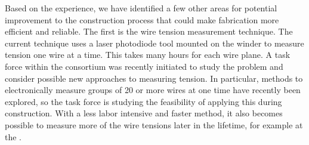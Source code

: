 Based on the  experience, we have identified a few other areas for potential improvement to the construction process that could make  fabrication more efficient and reliable.   The first is the wire tension measurement technique. The current technique uses a laser photodiode tool mounted on the winder to measure tension one wire at a time. This takes many hours for each wire plane. A task force within the consortium was recently initiated to study the problem and consider possible new approaches to measuring tension.  In particular, methods to electronically measure groups of \num{20} or more wires at one time have recently been explored, so the task force is studying the feasibility of applying this during  construction. With a less labor intensive and faster method, it also becomes possible to measure more of the wire tensions later in the lifetime, for example at the .  





